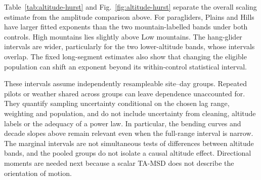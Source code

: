 \begin{table}[htbp]
 \centering
 \caption{Effective exponents $H_{\mathrm{eff}}$ from the full
 10--10,000-s fit, with marginal 95\% site--day bootstrap intervals in brackets.
 The two columns use the same weighting and segment controls as
 Fig.~\ref{fig:altitude-hurst}.}
 \label{tab:altitude-hurst}
 \small
 
\end{table}

Table~\ref{tab:altitude-hurst} and Fig.~\ref{fig:altitude-hurst} separate the
overall scaling estimate from the amplitude comparison above. For paragliders,
Plains and Hills have larger fitted exponents than the two mountain-labelled
bands under both controls. High mountains lies slightly above Low mountains.
The hang-glider intervals are wider, particularly for the two lower-altitude
bands, whose intervals overlap. The fixed long-segment estimates also show
that changing the eligible population can shift an exponent beyond its
within-control statistical interval.

These intervals assume independently resampleable site--day groups. Repeated
pilots or weather shared across groups can leave dependence unaccounted for.
They quantify sampling uncertainty conditional on the chosen lag range,
weighting and population, and do not include uncertainty from cleaning,
altitude labels or the adequacy of a power law. In particular, the bending
curves and decade slopes above remain relevant even when the full-range
interval is narrow. The marginal intervals are not simultaneous tests of
differences between altitude bands, and the pooled groups do not isolate a
causal altitude effect. Directional moments are needed next because a scalar
TA-MSD does not describe the orientation of motion.

\FloatBarrier
